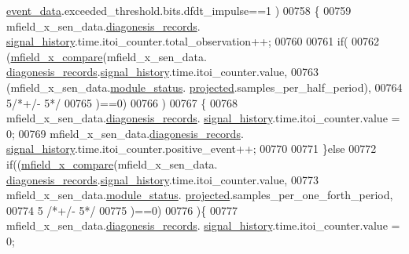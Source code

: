 \begin{DoxyCode}
      \hyperlink{a00028_a8c0bda69e71ef674e60da47ad0be9ab0}{event\_data}.exceeded\_threshold.bits.dfdt\_impulse==1 )
00758                 \{
00759                      mfield\_x\_sen\_data.\hyperlink{a00025_a2bd79ce84bbd6b7f50d38954f7ae475e}{diagonesis\_records}.
      \hyperlink{a00019_ab7038f4de1f77b52a7f89e9f77c0b846}{signal\_history}.time.itoi\_counter.total\_observation++;
00760 
00761                      \textcolor{keywordflow}{if}(
00762                         (\hyperlink{a00052_adf290c10214480d55f3631c1760188b0}{mfield\_x\_compare}(mfield\_x\_sen\_data.
      \hyperlink{a00025_a2bd79ce84bbd6b7f50d38954f7ae475e}{diagonesis\_records}.\hyperlink{a00019_ab7038f4de1f77b52a7f89e9f77c0b846}{signal\_history}.time.itoi\_counter.value,
00763                                (mfield\_x\_sen\_data.\hyperlink{a00025_adfab5a5d8b45a93dfb13edb24e2b80e3}{module\_status}.
      \hyperlink{a00019_af2267fb093fb5dcaa006a570a6da3b6b}{projected}.samples\_per\_half\_period),
00764                                5\textcolor{comment}{/*+/- 5*/}
00765                           )==0)
00766                          )
00767                        \{
00768                            mfield\_x\_sen\_data.\hyperlink{a00025_a2bd79ce84bbd6b7f50d38954f7ae475e}{diagonesis\_records}.
      \hyperlink{a00019_ab7038f4de1f77b52a7f89e9f77c0b846}{signal\_history}.time.itoi\_counter.value = 0;
00769                            mfield\_x\_sen\_data.\hyperlink{a00025_a2bd79ce84bbd6b7f50d38954f7ae475e}{diagonesis\_records}.
      \hyperlink{a00019_ab7038f4de1f77b52a7f89e9f77c0b846}{signal\_history}.time.itoi\_counter.positive\_event++;
00770 
00771                        \}\textcolor{keywordflow}{else}
00772                           \textcolor{keywordflow}{if}((\hyperlink{a00052_adf290c10214480d55f3631c1760188b0}{mfield\_x\_compare}(mfield\_x\_sen\_data.
      \hyperlink{a00025_a2bd79ce84bbd6b7f50d38954f7ae475e}{diagonesis\_records}.\hyperlink{a00019_ab7038f4de1f77b52a7f89e9f77c0b846}{signal\_history}.time.itoi\_counter.value,
00773                                mfield\_x\_sen\_data.\hyperlink{a00025_adfab5a5d8b45a93dfb13edb24e2b80e3}{module\_status}.
      \hyperlink{a00019_af2267fb093fb5dcaa006a570a6da3b6b}{projected}.samples\_per\_one\_forth\_period,
00774                                5 \textcolor{comment}{/*+/- 5*/}
00775                           )==0)
00776                         )\{
00777                           mfield\_x\_sen\_data.\hyperlink{a00025_a2bd79ce84bbd6b7f50d38954f7ae475e}{diagonesis\_records}.
      \hyperlink{a00019_ab7038f4de1f77b52a7f89e9f77c0b846}{signal\_history}.time.itoi\_counter.value = 0;

\end{DoxyCode}
